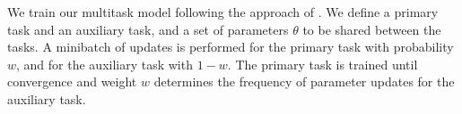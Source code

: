 We train our multitask model following the approach of \cite{Luong2016}. We define a primary task and an auxiliary task, and a set of parameters $\theta$ to be shared between the tasks. A minibatch of updates is performed for the primary task with probability $w$, and for the auxiliary task with $1-w$. The primary task is trained until convergence and weight $w$ 
determines the frequency of parameter updates for the auxiliary task.
